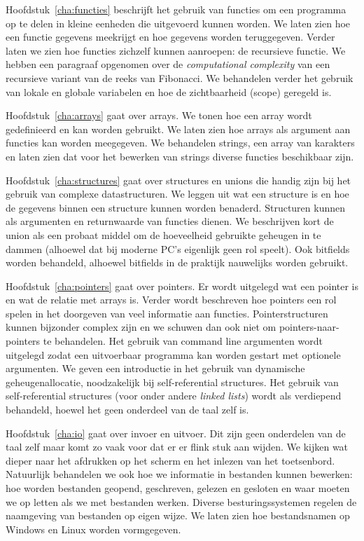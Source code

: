 Hoofdstuk~\ref{cha:functies} beschrijft het gebruik van functies om een programma op te delen in kleine eenheden die uitgevoerd kunnen worden. We laten zien hoe een functie gegevens meekrijgt en hoe gegevens worden teruggegeven. Verder laten we zien hoe functies zichzelf kunnen aanroepen: de recursieve functie. We hebben een paragraaf opgenomen over de \textsl{computational complexity} van een recursieve variant van de reeks van Fibonacci. We behandelen verder het gebruik van lokale en globale variabelen en hoe de zichtbaarheid (scope) geregeld is.

Hoofdstuk~\ref{cha:arrays} gaat over arrays. We tonen hoe een array wordt gedefinieerd en kan worden gebruikt. We laten zien hoe arrays als argument aan functies kan worden meegegeven. We behandelen strings, een array van karakters en laten zien dat voor het bewerken van strings diverse functies beschikbaar zijn.

Hoofdstuk~\ref{cha:structures} gaat over structures en unions die handig zijn bij het gebruik van complexe datastructuren. We leggen uit wat een structure is en hoe de gegevens binnen een structure kunnen worden benaderd. Structuren kunnen als argumenten en returnwaarde van functies dienen. We beschrijven kort de union als een probaat middel om de hoeveelheid gebruikte geheugen in te dammen (alhoewel dat bij moderne PC's eigenlijk geen rol speelt). Ook bitfields worden behandeld, alhoewel bitfields in de praktijk nauwelijks worden gebruikt.

Hoofdstuk~\ref{cha:pointers} gaat over pointers. Er wordt uitgelegd wat een pointer is en wat de relatie met arrays is. Verder wordt beschreven hoe pointers een rol spelen in het doorgeven van veel informatie aan functies. Pointerstructuren kunnen bijzonder complex zijn en we schuwen dan ook niet om pointers-naar-pointers te behandelen. Het gebruik van command line argumenten wordt uitgelegd zodat een uitvoerbaar programma kan worden gestart met optionele argumenten. We geven een introductie in het gebruik van dynamische geheugenallocatie, noodzakelijk bij self-referential structures. Het gebruik van self-referential structures (voor onder andere \textsl{linked lists}) wordt als verdiepend behandeld, hoewel het geen onderdeel van de taal zelf is.
 
Hoofdstuk~\ref{cha:io} gaat over invoer en uitvoer. Dit zijn geen onderdelen van de taal zelf maar komt zo vaak voor dat er er flink stuk aan wijden. We kijken wat dieper naar het afdrukken op het scherm en het inlezen van het toetsenbord. Natuurlijk behandelen we ook hoe we informatie in bestanden kunnen bewerken: hoe worden bestanden geopend, geschreven, gelezen en gesloten en waar moeten we op letten als we met bestanden werken. Diverse  besturingssystemen regelen de naamgeving van bestanden op eigen wijze. We laten zien hoe bestandsnamen op Windows en Linux worden vormgegeven.

